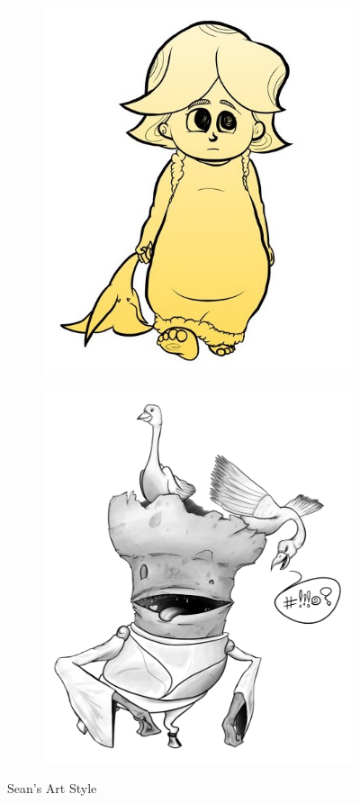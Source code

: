 \begin{figure}[H]
\begin{subfigure}{.11\textwidth}
  \end{subfigure}
  \\
  \begin{subfigure}{.3\textwidth}
    \centering
    \includegraphics[width=.9\linewidth]{images/ref_SEAN03}
  \end{subfigure}
  \begin{subfigure}{.3\textwidth}
    \centering
    \includegraphics[width=.9\linewidth]{images/ref_SEAN04}
  \end{subfigure}
  \caption{Sean's Art Style}
  \label{fig:sstyle}
\end{figure}

